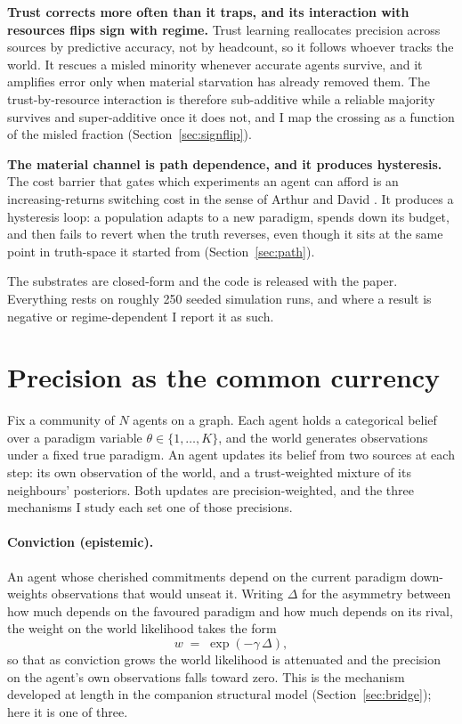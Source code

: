 \documentclass[11pt]{article}
\begin{document}
\textbf{Trust corrects more often than it traps, and its interaction with
resources flips sign with regime.} Trust learning reallocates precision across
sources by predictive accuracy, not by headcount, so it follows whoever tracks
the world. It rescues a misled minority whenever accurate agents survive, and
it amplifies error only when material starvation has already removed them. The
trust-by-resource interaction is therefore sub-additive while a reliable
majority survives and super-additive once it does not, and I map the crossing
as a function of the misled fraction (Section~\ref{sec:signflip}).

\textbf{The material channel is path dependence, and it produces hysteresis.}
The cost barrier that gates which experiments an agent can afford is an
increasing-returns switching cost in the sense of Arthur and David
\citep{arthur1994IncreasingReturns,david1985QWERTY}. It produces a hysteresis
loop: a population adapts to a new paradigm, spends down its budget, and then
fails to revert when the truth reverses, even though it sits at the same point
in truth-space it started from (Section~\ref{sec:path}).

The substrates are closed-form and the code is released with the paper.
Everything rests on roughly 250 seeded simulation runs, and where a result is
negative or regime-dependent I report it as such.

\section{Precision as the common currency}
\label{sec:currency}

Fix a community of $N$ agents on a graph. Each agent holds a categorical belief
over a paradigm variable $\theta \in \{1,\dots,K\}$, and the world generates
observations under a fixed true paradigm. An agent updates its belief from two
sources at each step: its own observation of the world, and a trust-weighted
mixture of its neighbours' posteriors. Both updates are precision-weighted, and
the three mechanisms I study each set one of those precisions.

\paragraph{Conviction (epistemic).} An agent whose cherished commitments depend
on the current paradigm down-weights observations that would unseat it. Writing
$\Delta$ for the asymmetry between how much depends on the favoured paradigm and
how much depends on its rival, the weight on the world likelihood takes the form
\[
w \;=\; \exp(-\gamma\,\Delta),
\]
so that as conviction grows the world likelihood is attenuated and the
precision on the agent's own observations falls toward zero. This is the
mechanism developed at length in the companion structural model
(Section~\ref{sec:bridge}); here it is one of three.
\end{document}
